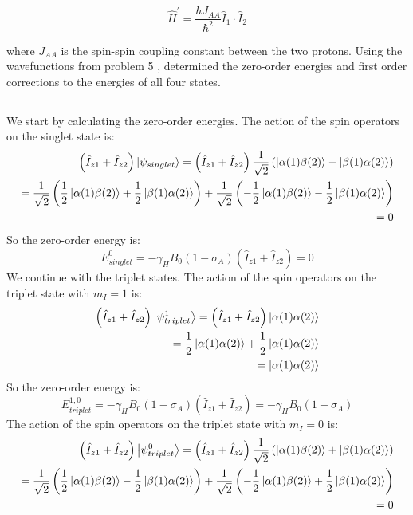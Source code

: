 \documentclass[12pt]{article}
\begin{document}
$$
\widehat{H}^{\prime}=\frac{h J_{A A}}{\hbar^{2}} \hat{I}_{1} \cdot \hat{I}_{2}
$$

where $J_{A A}$ is the spin-spin coupling constant between the two protons. Using the wavefunctions from problem 5 , determined the zero-order energies and first order corrections to the energies of all four states.
\subsection{}
We start by calculating the zero-order energies. The action of the spin operators on the singlet state is:
\begin{align}
  \left(\hat{I}_{z 1} + \hat{I}_{z 2}\right) \ket{\psi_{singlet}} = \left(\hat{I}_{z 1} + \hat{I}_{z 2}\right) \frac{1}{\sqrt{2}} \left( \ket{\alpha(1)\beta(2)} - \ket{\beta(1)\alpha(2)} \right)\\
  = \frac{1}{\sqrt{2}} \left( \frac{1}{2} \ket{\alpha(1)\beta(2)} + \frac{1}{2}\ket{\beta(1)\alpha(2)} \right) + \frac{1}{\sqrt{2}} \left( -\frac{1}{2} \ket{\alpha(1)\beta(2)} - \frac{1}{2}\ket{\beta(1)\alpha(2)} \right)\\
  = 0
\end{align}
So the zero-order energy is:
\begin{equation}
  E_{singlet}^{0} = -\gamma_{H} B_{0}\left(1-\sigma_{A}\right)\left(\hat{I}_{z 1}+\hat{I}_{z 2}\right) = 0
\end{equation}
We continue with the triplet states. The action of the spin operators on the triplet state with $m_I = 1$ is:
\begin{align}
  \left(\hat{I}_{z 1} + \hat{I}_{z 2}\right) \ket{\psi_{triplet}^{1}} = \left(\hat{I}_{z 1} + \hat{I}_{z 2}\right) \ket{\alpha(1)\alpha(2)}\\
  = \frac{1}{2} \ket{\alpha(1)\alpha(2)} + \frac{1}{2} \ket{\alpha(1)\alpha(2)}\\
  = \ket{\alpha(1)\alpha(2)}
\end{align}
So the zero-order energy is:
\begin{equation}
  E_{triplet}^{1,0} = -\gamma_{H} B_{0}\left(1-\sigma_{A}\right)\left(\hat{I}_{z 1}+\hat{I}_{z 2}\right) = -\gamma_{H} B_{0}\left(1-\sigma_{A}\right)
\end{equation}
The action of the spin operators on the triplet state with $m_I = 0$ is:
\begin{align}
  \left(\hat{I}_{z 1} + \hat{I}_{z 2}\right) \ket{\psi_{triplet}^{0}} = \left(\hat{I}_{z 1} + \hat{I}_{z 2}\right) \frac{1}{\sqrt{2}} \left( \ket{\alpha(1)\beta(2)} + \ket{\beta(1)\alpha(2)} \right)\\
  = \frac{1}{\sqrt{2}} \left( \frac{1}{2} \ket{\alpha(1)\beta(2)} - \frac{1}{2}\ket{\beta(1)\alpha(2)} \right) + \frac{1}{\sqrt{2}} \left( - \frac{1}{2} \ket{\alpha(1)\beta(2)} + \frac{1}{2}\ket{\beta(1)\alpha(2)} \right)\\
  = 0
\end{align}
\end{document}
